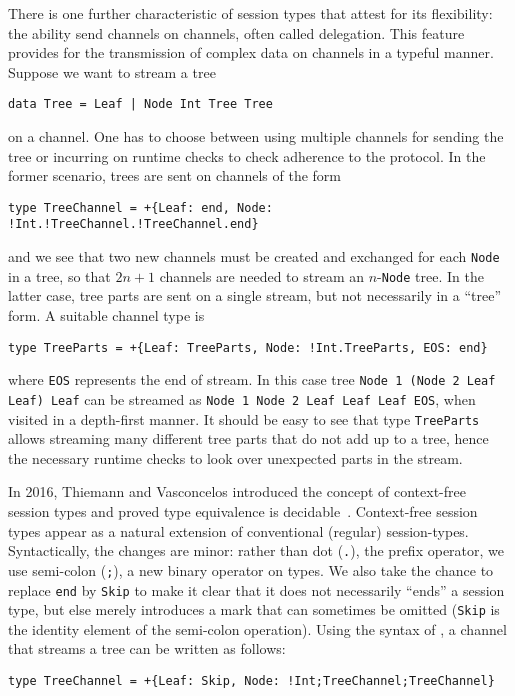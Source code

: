 There is one further characteristic of session types that attest for
its flexibility: the ability send channels on channels, often called
delegation. This feature provides for the transmission of complex data
on channels in a typeful manner. Suppose we want to stream a tree
%
\begin{lstlisting}
data Tree = Leaf | Node Int Tree Tree
\end{lstlisting}
%
on a channel. One has to choose between using multiple channels for
sending the tree or incurring on runtime checks to check adherence to
the protocol. In the former scenario, trees are sent on channels of
the form
%
\begin{lstlisting}[morekeywords=end]
type TreeChannel = +{Leaf: end, Node: !Int.!TreeChannel.!TreeChannel.end}
\end{lstlisting}
%
and we see that two new channels must be created and exchanged for
each \lstinline|Node| in a tree, so that $2n+1$ channels are needed to
stream an $n$-\lstinline|Node| tree.
%
In the latter case, tree parts are sent on a single stream, but not
necessarily in a ``tree'' form. A suitable channel type is
%
\begin{lstlisting}[morekeywords=end]
type TreeParts = +{Leaf: TreeParts, Node: !Int.TreeParts, EOS: end}
\end{lstlisting}
%
where \lstinline|EOS| represents the end of stream. In this case tree
\lstinline|Node 1 (Node 2 Leaf Leaf) Leaf| can be streamed as
\lstinline|Node 1 Node 2 Leaf Leaf Leaf EOS|, when visited in a
depth-first manner. It should be easy to see that type
\lstinline|TreeParts| allows streaming many different tree parts that
do not add up to a tree, hence the necessary runtime checks to look
over unexpected parts in the stream.

In 2016, Thiemann and Vasconcelos introduced the concept of
context-free session types and proved type equivalence is
decidable~\cite{DBLP:conf/icfp/ThiemannV16}.
%
Context-free session types appear as a natural extension of
conventional (regular) session-types. Syntactically, the changes are
minor: rather than dot (\lstinline|.|), the prefix operator, we use
semi-colon (\lstinline|;|), a new binary operator on types. We also
take the chance to replace \lstinline [morekeywords=end]|end| by
\lstinline|Skip| to make it clear that it does not necessarily
``ends'' a session type, but else merely introduces a mark that can
sometimes be omitted (\lstinline|Skip| is the identity element of the
semi-colon operation).
%
Using the syntax of \freest, a channel that streams a tree can be
written as follows:
%
\begin{lstlisting}
type TreeChannel = +{Leaf: Skip, Node: !Int;TreeChannel;TreeChannel}
\end{lstlisting}

